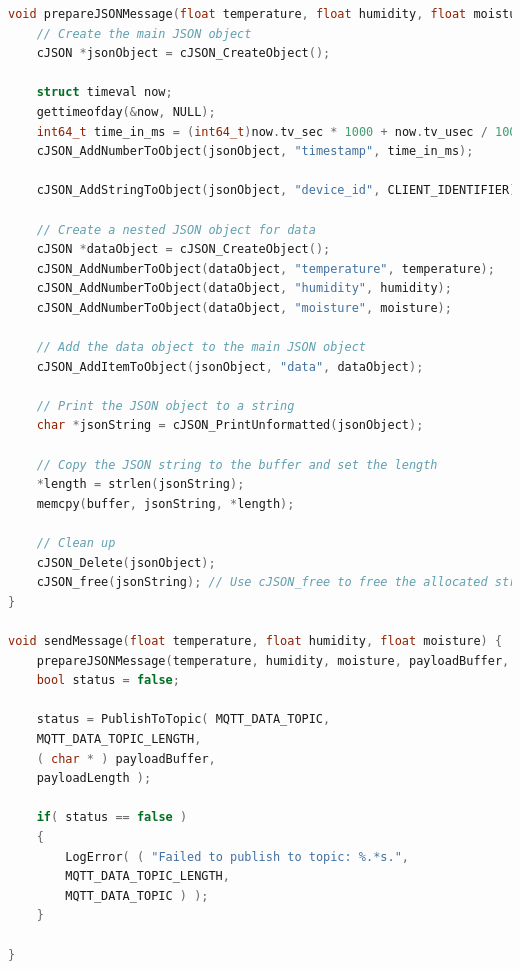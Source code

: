 \begin{lstlisting}[caption={Funkcije za pripremanje JSON objekta i njegovo slanje protokolom MQTT}, language=c]
void prepareJSONMessage(float temperature, float humidity, float moisture, uint8_t *buffer, size_t *length) {
	// Create the main JSON object
	cJSON *jsonObject = cJSON_CreateObject();
	
	struct timeval now;
	gettimeofday(&now, NULL);
	int64_t time_in_ms = (int64_t)now.tv_sec * 1000 + now.tv_usec / 1000;
	cJSON_AddNumberToObject(jsonObject, "timestamp", time_in_ms);
	
	cJSON_AddStringToObject(jsonObject, "device_id", CLIENT_IDENTIFIER);
	
	// Create a nested JSON object for data
	cJSON *dataObject = cJSON_CreateObject();
	cJSON_AddNumberToObject(dataObject, "temperature", temperature);
	cJSON_AddNumberToObject(dataObject, "humidity", humidity);
	cJSON_AddNumberToObject(dataObject, "moisture", moisture);
	
	// Add the data object to the main JSON object
	cJSON_AddItemToObject(jsonObject, "data", dataObject);
	
	// Print the JSON object to a string
	char *jsonString = cJSON_PrintUnformatted(jsonObject);
	
	// Copy the JSON string to the buffer and set the length
	*length = strlen(jsonString);
	memcpy(buffer, jsonString, *length);
	
	// Clean up
	cJSON_Delete(jsonObject);
	cJSON_free(jsonString); // Use cJSON_free to free the allocated string
}

void sendMessage(float temperature, float humidity, float moisture) {
	prepareJSONMessage(temperature, humidity, moisture, payloadBuffer, &payloadLength);
	bool status = false;
	
	status = PublishToTopic( MQTT_DATA_TOPIC,
	MQTT_DATA_TOPIC_LENGTH,
	( char * ) payloadBuffer,
	payloadLength );
	
	if( status == false )
	{
		LogError( ( "Failed to publish to topic: %.*s.",
		MQTT_DATA_TOPIC_LENGTH,
		MQTT_DATA_TOPIC ) );
	}
	
}
\end{lstlisting}

